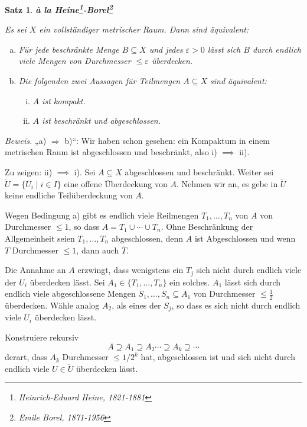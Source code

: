 \documentclass[12pt]{scrbook}   %
\newtheorem{satzX}[alles]{Satz}
\newenvironment{satz}[1]{\begin{satzX}{\bf #1}\par}{\end{satzX}}
\begin{document}
\begin{satz}{\`a la Heine\footnote{Heinrich-Eduard Heine, 1821-1881}-Borel\footnote{Emile Borel, 1871-1956}}
\label{heineborel}

Es sei $X$ ein vollständiger metrischer Raum. Dann sind äquivalent:

\begin{enumerate}[a)]
\item Für jede beschränkte
Menge $B\subseteq X$ und jedes $\varepsilon>0$ lässt sich $B$ durch endlich viele
Mengen von Durchmesser $\leq \varepsilon$ überdecken.

\item Die folgenden zwei Aussagen für Teilmengen $A\subseteq X$ sind äquivalent:
\begin{enumerate}[i)]
\item $A$ ist kompakt.
\item $A$ ist beschränkt und abgeschlossen.
\end{enumerate}

\end{enumerate}

\end{satz}

{\it Beweis.} 
„a) $\Longrightarrow$ b)“:
Wir haben schon gesehen: ein Kompaktum 
in einem metrischen Raum ist abgeschlossen und beschränkt, also i) $\implies$ ii).

Zu zeigen: ii) $\implies$ i). Sei $A\subseteq X$ abgeschlossen und beschränkt. Weiter sei 
$\ddot U = \{U_i \mid i\in I\}$ eine offene Überdeckung von $A$. Nehmen wir an, es gebe in 
$\ddot U$ keine endliche Teilüberdeckung von $A$.

Wegen Bedingung a) gibt es endlich viele Reilmengen $T_1,\ldots,T_n$ von $A$ von Durchmesser $\le 1$, so dass $A=T_1\cup\cdots\cup T_n$. Ohne Beschränkung der Allgemeinheit seien $T_1,\ldots,T_n$ abgeschlossen, denn $A$ ist Abgeschlossen und wenn $T$ Durchmesser $\le1$, dann auch $\bar T$.

Die Annahme an $A$ erzwingt, dass wenigstens ein $T_j$ sich nicht durch endlich viele der $U_i$ überdecken lässt. Sei $A_1 \in \{T_1,\ldots,T_n\}$ ein solches. $A_1$ lässt sich durch endlich viele abgeschlossene Mengen $S_1,\ldots,S_n\subseteq A_1$ von Durchmesser $\le \frac12$ überdecken. Wähle analog $A_2$, als eines der $S_j$, so dass es sich nicht durch endlich viele $U_i$ überdecken lässt.

Konstruiere rekursiv
$$A\supseteq A_1\supseteq A_2\cdots \supseteq A_k\supseteq \cdots$$
derart, dass $A_k$ Durchmesser $\leq 1/2^k$ hat, abgeschlossen ist und sich nicht durch endlich 
viele $U\in \ddot U$ überdecken lässt. 
\end{document}
